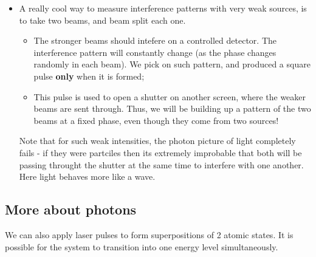 \begin{itemize}
 	
 	\item A really cool way to measure interference patterns with very weak sources, is to take two beams, and beam split each one. 
 	\begin{itemize}
 		\item The stronger beams should intefere on a controlled detector. The interference pattern will constantly change (as the phase changes randomly in each beam). We pick on such pattern, and produced a square pulse \textbf{only} when it is formed;
 		\item This pulse is used to open a shutter on another screen, where the weaker beams are sent through. Thus, we will be building up a pattern of the two beams at a fixed phase, even though they come from two sources!
 	\end{itemize}
 	Note that for such weak intensities, the photon picture of light completely fails - if they were partciles then its extremely improbable that both will be passing throught the shutter at the same time to interfere with one another. Here light behaves more like a wave.
 \end{itemize}

 \subsection{More about photons}
  We can also apply laser pulses to form superpositions of 2 atomic states. It is possible for the system to transition into one energy level simultaneously. 
  

